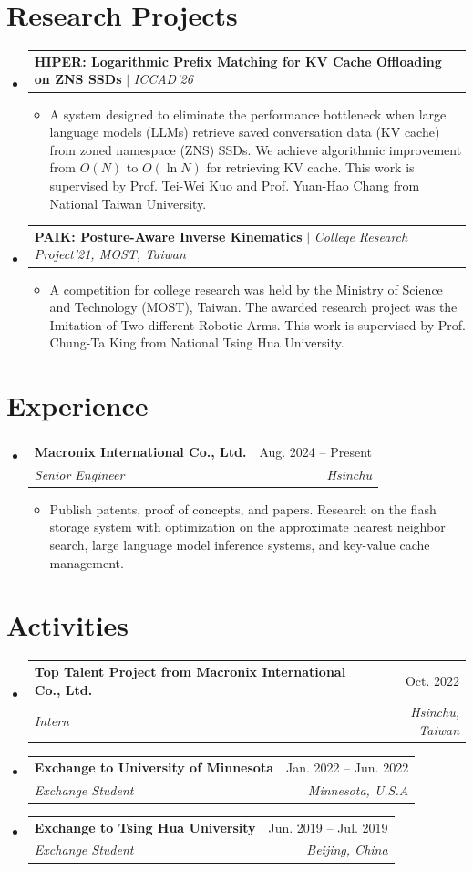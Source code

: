 \documentclass[letterpaper,11pt]{article}
\makeatletter
\newcommand{\resumeItem}[1]{
  \item\small{
    {#1 \vspace{-2pt}}
  }
}
\newcommand{\resumeSubheading}[4]{
  \vspace{-2pt}\item
    \begin{tabular*}{0.97\textwidth}[t]{l@{\extracolsep{\fill}}r}
      \textbf{#1} & #2 \\
      \textit{\small#3} & \textit{\small #4} \\
    \end{tabular*}\vspace{-7pt}
}
\newcommand{\resumeProjectHeading}[2]{
    \item
    \begin{tabular*}{0.97\textwidth}{l@{\extracolsep{\fill}}r}
      \small#1 & #2 \\
    \end{tabular*}\vspace{-7pt}
}
\newcommand{\resumeSubHeadingListStart}{\begin{itemize}[leftmargin=0.15in, label={}]}
\newcommand{\resumeSubHeadingListEnd}{\end{itemize}}
\newcommand{\resumeItemListStart}{\begin{itemize}}
\newcommand{\resumeItemListEnd}{\end{itemize}\vspace{-5pt}}
\makeatother
\begin{document}
\section{Research Projects}
    \resumeSubHeadingListStart
      \resumeProjectHeading
          {\textbf{HIPER: Logarithmic Prefix Matching for KV Cache Offloading on ZNS SSDs} $|$ \emph{ICCAD'26}}{}
          \resumeItemListStart
            \resumeItem{A system designed to eliminate the performance bottleneck when large language models (LLMs) retrieve saved conversation data (KV cache) from zoned namespace (ZNS) SSDs. We achieve algorithmic improvement from $O(N)$ to $O(\ln N)$ for retrieving KV cache. This work is supervised by Prof. Tei-Wei Kuo and Prof. Yuan-Hao Chang from National Taiwan University.}
          \resumeItemListEnd
      \resumeProjectHeading
          {\textbf{PAIK: Posture-Aware Inverse Kinematics} $|$ \emph{College Research Project'21, MOST, Taiwan}}{}
          \resumeItemListStart
            \resumeItem{A competition for college research was held by the Ministry of Science and Technology (MOST), Taiwan. The awarded research project was the Imitation of Two different Robotic Arms. This work is supervised by Prof. Chung-Ta King from National Tsing Hua University.}
          \resumeItemListEnd
    \resumeSubHeadingListEnd

\section{Experience}
  \resumeSubHeadingListStart
    \resumeSubheading
      {Macronix International Co., Ltd.}{Aug. 2024 -- Present}
      {Senior Engineer}{Hsinchu}
      \resumeItemListStart
        \resumeItem{Publish patents, proof of concepts, and papers. Research on the flash storage system with optimization on the approximate nearest neighbor search, large language model inference systems, and key-value cache management.}
      \resumeItemListEnd
  \resumeSubHeadingListEnd

\section{Activities}
  \resumeSubHeadingListStart
    \resumeSubheading
      {Top Talent Project from Macronix International Co., Ltd.}{Oct. 2022}
      {Intern}{Hsinchu, Taiwan}
    \resumeSubheading
      {Exchange to University of Minnesota}{Jan. 2022 -- Jun. 2022}
      {Exchange Student}{Minnesota, U.S.A}
    \resumeSubheading
      {Exchange to Tsing Hua University}{Jun. 2019 -- Jul. 2019}
      {Exchange Student}{Beijing, China}
  \resumeSubHeadingListEnd
\end{document}
